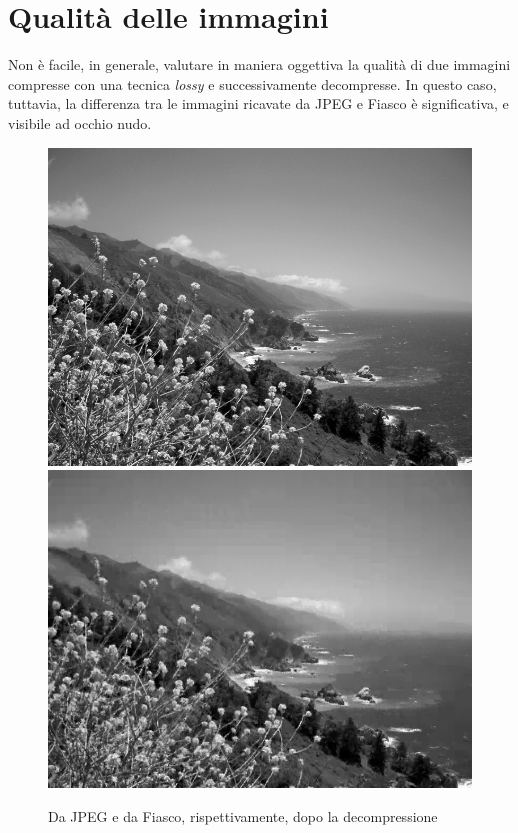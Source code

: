 \documentclass[11pt,a4paper,appendixprefix=true,numbers=noenddot]{scrreprt}
\begin{document}
\section{ Qualità delle immagini }

Non è facile, in generale, valutare in maniera oggettiva la qualità di due immagini compresse con una tecnica \emph{lossy} e successivamente decompresse. In questo caso, tuttavia, la differenza tra le immagini ricavate da JPEG e Fiasco è significativa, e visibile ad occhio nudo.

\begin{figure}[!ht]
\centering
\includegraphics[scale=0.25]{images/california-coast-jpeg.png} 
\includegraphics[scale=0.25]{images/california-coast-fiasco.png} 
\caption{ Da JPEG e da Fiasco, rispettivamente, dopo la decompressione }
\end{figure}
\end{document}

